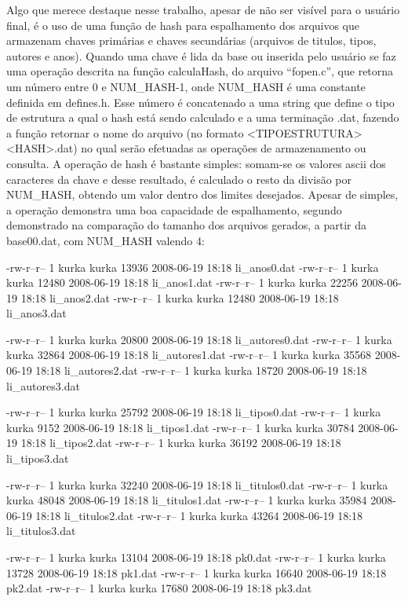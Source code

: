 \documentclass{article}
\begin{document}
Algo que merece destaque nesse trabalho, apesar de não ser visível para o usuário final, é o uso de uma função de hash para espalhamento dos arquivos que armazenam chaves primárias e chaves secundárias (arquivos de titulos, tipos, autores e anos).
Quando uma chave é lida da base ou inserida pelo usuário se faz uma operação descrita na função calculaHash, do arquivo ``fopen.c'', que retorna um número entre 0 e NUM_HASH-1, onde NUM_HASH é uma constante definida em defines.h. Esse número é concatenado a uma string que define o tipo de estrutura a qual o hash está sendo calculado e a uma terminação .dat, fazendo a função retornar o nome do arquivo (no formato <TIPOESTRUTURA><HASH>.dat) no qual serão efetuadas as operações de armazenamento ou consulta.
A operação de hash é bastante simples: somam-se os valores ascii dos caracteres da chave e desse resultado, é calculado o resto da divisão por NUM_HASH, obtendo um valor dentro dos limites desejados.
Apesar de simples, a operação demonstra uma boa capacidade de espalhamento, segundo demonstrado na comparação do tamanho dos arquivos gerados, a partir da base00.dat, com NUM_HASH valendo 4:

-rw-r--r-- 1 kurka kurka  13936 2008-06-19 18:18 li_anos0.dat
-rw-r--r-- 1 kurka kurka  12480 2008-06-19 18:18 li_anos1.dat
-rw-r--r-- 1 kurka kurka  22256 2008-06-19 18:18 li_anos2.dat
-rw-r--r-- 1 kurka kurka  12480 2008-06-19 18:18 li_anos3.dat

-rw-r--r-- 1 kurka kurka  20800 2008-06-19 18:18 li_autores0.dat
-rw-r--r-- 1 kurka kurka  32864 2008-06-19 18:18 li_autores1.dat
-rw-r--r-- 1 kurka kurka  35568 2008-06-19 18:18 li_autores2.dat
-rw-r--r-- 1 kurka kurka  18720 2008-06-19 18:18 li_autores3.dat

-rw-r--r-- 1 kurka kurka  25792 2008-06-19 18:18 li_tipos0.dat
-rw-r--r-- 1 kurka kurka   9152 2008-06-19 18:18 li_tipos1.dat
-rw-r--r-- 1 kurka kurka  30784 2008-06-19 18:18 li_tipos2.dat
-rw-r--r-- 1 kurka kurka  36192 2008-06-19 18:18 li_tipos3.dat

-rw-r--r-- 1 kurka kurka  32240 2008-06-19 18:18 li_titulos0.dat
-rw-r--r-- 1 kurka kurka  48048 2008-06-19 18:18 li_titulos1.dat
-rw-r--r-- 1 kurka kurka  35984 2008-06-19 18:18 li_titulos2.dat
-rw-r--r-- 1 kurka kurka  43264 2008-06-19 18:18 li_titulos3.dat

-rw-r--r-- 1 kurka kurka  13104 2008-06-19 18:18 pk0.dat
-rw-r--r-- 1 kurka kurka  13728 2008-06-19 18:18 pk1.dat
-rw-r--r-- 1 kurka kurka  16640 2008-06-19 18:18 pk2.dat
-rw-r--r-- 1 kurka kurka  17680 2008-06-19 18:18 pk3.dat
\end{document}
